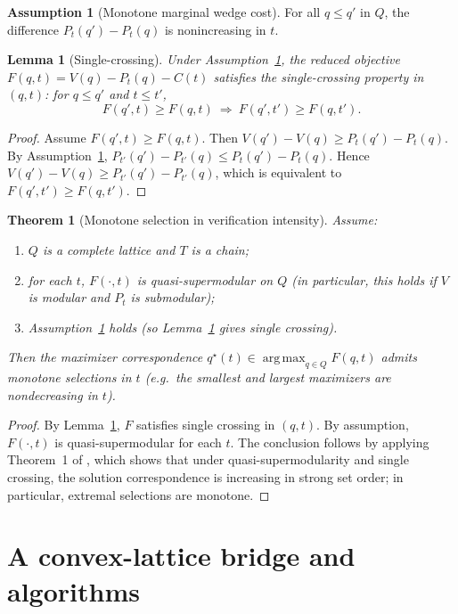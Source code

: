 \documentclass[final,3p,times]{elsarticle}
\theoremstyle{plain}
\newtheorem{theorem}{Theorem}
\newtheorem{lemma}{Lemma}
\theoremstyle{definition}
\newtheorem{assumption}{Assumption}
\newcommand{\1}{\mathbbm{1}}
\newcommand{\argmax}{\mathop{\mathrm{arg\,max}}}
\begin{document}
\begin{assumption}[Monotone marginal wedge cost]\label{ass:mmc}
For all $q\le q'$ in $Q$, the difference $P_t(q')-P_t(q)$ is nonincreasing in $t$.
\end{assumption}

\begin{lemma}[Single-crossing]\label{lem:singlecross}
Under Assumption~\ref{ass:mmc}, the reduced objective $F(q,t)=V(q)-P_t(q)-C(t)$ satisfies the single-crossing property in $(q,t)$: for $q\le q'$ and $t\le t'$,
\[
F(q',t)\ge F(q,t)\ \Rightarrow\ F(q',t')\ge F(q,t').
\]
\end{lemma}

\begin{proof}
Assume $F(q',t)\ge F(q,t)$. Then $V(q')-V(q)\ge P_t(q')-P_t(q)$. By Assumption~\ref{ass:mmc}, $P_{t'}(q')-P_{t'}(q)\le P_t(q')-P_t(q)$. Hence $V(q')-V(q)\ge P_{t'}(q')-P_{t'}(q)$, which is equivalent to $F(q',t')\ge F(q,t')$.
\end{proof}

\begin{theorem}[Monotone selection in verification intensity]\label{thm:MS}
Assume:
\begin{enumerate}[label=(\roman*)]
\item $Q$ is a complete lattice and $T$ is a chain;
\item for each $t$, $F(\cdot,t)$ is quasi-supermodular on $Q$ (in particular, this holds if $V$ is modular and $P_t$ is submodular);
\item Assumption~\ref{ass:mmc} holds (so Lemma~\ref{lem:singlecross} gives single crossing).
\end{enumerate}
Then the maximizer correspondence $q^\star(t)\in\argmax_{q\in Q}F(q,t)$ admits monotone selections in $t$ (e.g.\ the smallest and largest maximizers are nondecreasing in $t$).
\end{theorem}

\begin{proof}
By Lemma~\ref{lem:singlecross}, $F$ satisfies single crossing in $(q,t)$. By assumption, $F(\cdot,t)$ is quasi-supermodular for each $t$. The conclusion follows by applying Theorem~1 of \citet{MilgromShannon1994}, which shows that under quasi-supermodularity and single crossing, the solution correspondence is increasing in strong set order; in particular, extremal selections are monotone.
\end{proof}

\section{A convex-lattice bridge and algorithms}\label{sec:alg}
\end{document}
